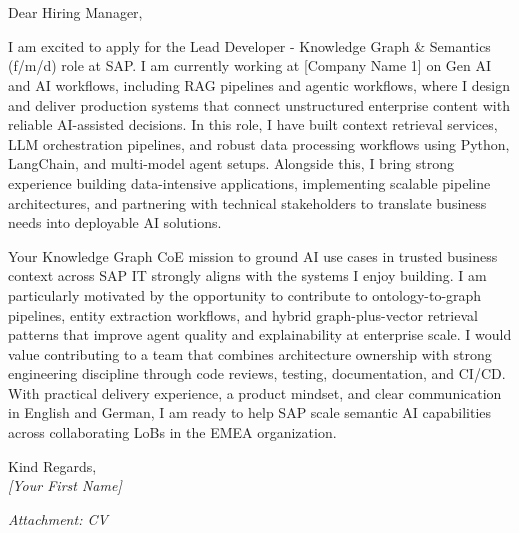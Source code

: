 \documentclass[a4paper,11pt]{article}
\author{[Your Name]}
\date{\today}{I}
\newcommand{\ApplicantName}{}
\newcommand{\AddressIlineOne}{}
\newcommand{\AddressIlineTwo}{}
\newcommand{\AddressIIlineOne}{}
\newcommand{\AddressIIlineTwo}{}
\newcommand{\EmailField}{}
\newcommand{\PhoneField}{}
\newcommand{\CompanyName}{}
\newcommand{\DateField}{}
\newlength{\HeaderLeftShift}
\newlength{\HeaderTopShift}
\renewcommand{\maketitle}{
\vspace*{\dimexpr-\HeaderTopShift-\fboxsep-1.0em\relax}
\noindent\makebox[0pt][l]{\hspace*{-\HeaderLeftShift}\colorbox{gray!10}{%
\parbox{\dimexpr\paperwidth-2\fboxsep\relax}{%
\hspace*{\HeaderLeftShift}\parbox{\textwidth}{%
\vspace*{\HeaderTopShift}
\begin{center}
{\fontsize{20}{24}\selectfont\bfseries \ApplicantName}\\[0.8em]
\EmailField \quad|\quad
LinkedIn: [Your LinkedIn URL] \quad|\quad
\PhoneField \quad|\quad
\AddressIlineOne
\\
\AddressIlineTwo
\end{center}

\vspace{0.25em}
}}}}
\vspace{0.45em}
}
\begin{document}
\maketitle

\DateField

\vspace{0.55em}
\textbf{\CompanyName}\\
\AddressIIlineOne\\
\AddressIIlineTwo

\vspace{0.65em}
Dear Hiring Manager,

I am excited to apply for the Lead Developer - Knowledge Graph \& Semantics (f/m/d) role at SAP. I am currently working at [Company Name 1] on Gen AI and AI workflows, including RAG pipelines and agentic workflows, where I design and deliver production systems that connect unstructured enterprise content with reliable AI-assisted decisions. In this role, I have built context retrieval services, LLM orchestration pipelines, and robust data processing workflows using Python, LangChain, and multi-model agent setups. Alongside this, I bring strong experience building data-intensive applications, implementing scalable pipeline architectures, and partnering with technical stakeholders to translate business needs into deployable AI solutions.

Your Knowledge Graph CoE mission to ground AI use cases in trusted business context across SAP IT strongly aligns with the systems I enjoy building. I am particularly motivated by the opportunity to contribute to ontology-to-graph pipelines, entity extraction workflows, and hybrid graph-plus-vector retrieval patterns that improve agent quality and explainability at enterprise scale. I would value contributing to a team that combines architecture ownership with strong engineering discipline through code reviews, testing, documentation, and CI/CD. With practical delivery experience, a product mindset, and clear communication in English and German, I am ready to help SAP scale semantic AI capabilities across collaborating LoBs in the EMEA organization.

\vspace{2.0em}
\begin{flushright}
Kind Regards,\\[1.0em]
{\fontsize{16}{22}\selectfont\textit{[Your First Name]}}\\[0.4em]
\end{flushright}

\vspace{0.2em}
\textit{Attachment: CV}
\end{document}
